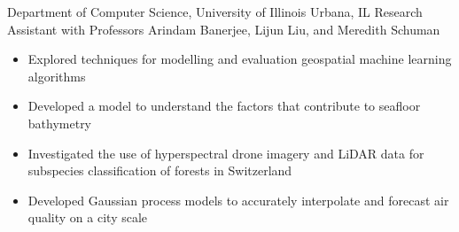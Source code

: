 
        {Department of Computer Science, University of Illinois}
        {Urbana, IL}
        {Research Assistant}
        {with Professors Arindam Banerjee, Lijun Liu, and Meredith Schuman}{
    \begin{itemize}
        \item Explored techniques for modelling and evaluation geospatial machine learning algorithms
        \item Developed a model to understand the factors that contribute to seafloor bathymetry
        \item Investigated the use of hyperspectral drone imagery and LiDAR data for subspecies classification of forests in Switzerland
        \item Developed Gaussian process models to accurately interpolate and forecast air quality on a city scale
    \end{itemize}
}
